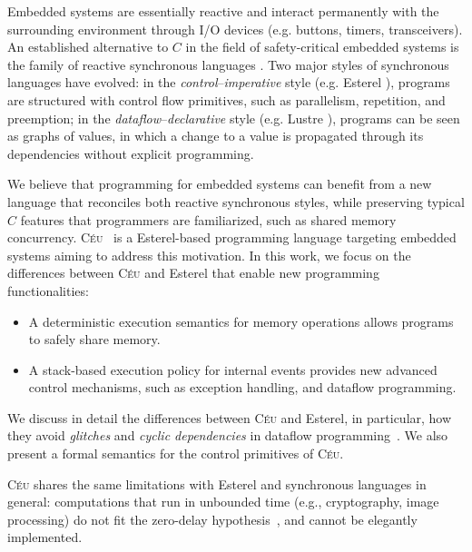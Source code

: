 \documentclass{acm_proc_article-sp}
\newcommand{\CEU}{\textsc{C\'{e}u}\xspace}
\newcommand{\1}{\;}
\newcommand{\2}{\;\;}
\newcommand{\3}{\;\;\;}
\newcommand{\5}{\;\;\;\;\;}
\begin{document}
Embedded systems are essentially reactive and interact permanently with the 
surrounding environment through I/O devices (e.g. buttons, timers, 
transceivers).
%
An established alternative to $C$ in the field of safety-critical embedded 
systems is the family of reactive synchronous languages \cite{rp.twelve}.
Two major styles of synchronous languages have evolved:
in the \emph{control}--\emph{imperative} style (e.g. Esterel 
\cite{esterel.design}), programs are structured with control flow primitives, 
such as parallelism, repetition, and preemption;
in the \emph{dataflow}--\emph{declarative} style (e.g. Lustre 
\cite{lustre.ieee91}), programs can be seen as graphs of values, in which a 
change to a value is propagated through its dependencies without explicit 
programming.

We believe that programming for embedded systems can benefit from a new 
language that reconciles both reactive synchronous styles, while preserving 
typical $C$ features that programmers are familiarized, such as shared memory 
concurrency.
%
\CEU~\cite{ceu.sensys}
is a Esterel-based programming language targeting embedded systems aiming to 
address this motivation.
In this work, we focus on the differences between \CEU and Esterel that enable 
new programming functionalities:
%
\begin{itemize}
\item A deterministic execution semantics for memory operations allows programs 
to safely share memory.
%
\item A stack-based execution policy for internal events provides new advanced 
control mechanisms, such as exception handling, and dataflow programming.
\end{itemize}

We discuss in detail the differences between \CEU and Esterel, in particular, 
how they avoid \emph{glitches} and \emph{cyclic dependencies} in dataflow 
programming~\cite{frp.survey}.
We also present a formal semantics for the control primitives of \CEU.

\CEU shares the same limitations with Esterel and synchronous languages in 
general:
computations that run in unbounded time (e.g., cryptography, image processing) 
do not fit the zero-delay hypothesis~\cite{rp.hypothesis}, and cannot be 
elegantly implemented.
\end{document}

